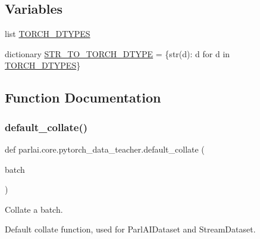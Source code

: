 \subsection*{Variables}
\begin{DoxyCompactItemize}
\item 
list \hyperlink{namespaceparlai_1_1core_1_1pytorch__data__teacher_a70d3594b63522c1d2596bd15f1fb89e0}{T\+O\+R\+C\+H\+\_\+\+D\+T\+Y\+P\+ES}
\item 
dictionary \hyperlink{namespaceparlai_1_1core_1_1pytorch__data__teacher_a34008e5ea53ba69d5da10b59d55abef4}{S\+T\+R\+\_\+\+T\+O\+\_\+\+T\+O\+R\+C\+H\+\_\+\+D\+T\+Y\+PE} = \{str(d)\+: d for d in \hyperlink{namespaceparlai_1_1core_1_1pytorch__data__teacher_a70d3594b63522c1d2596bd15f1fb89e0}{T\+O\+R\+C\+H\+\_\+\+D\+T\+Y\+P\+ES}\}
\end{DoxyCompactItemize}


\subsection{Function Documentation}
\mbox{\label{namespaceparlai_1_1core_1_1pytorch__data__teacher_a7236aa20497f2a598df9b85909901184}} 
\subsubsection{\texorpdfstring{default\+\_\+collate()}{default\_collate()}}
{\footnotesize\ttfamily def parlai.\+core.\+pytorch\+\_\+data\+\_\+teacher.\+default\+\_\+collate (\begin{DoxyParamCaption}\item[{}]{batch }\end{DoxyParamCaption})}

\begin{DoxyVerb}Collate a batch.

Default collate function, used for ParlAIDataset and StreamDataset.
\end{DoxyVerb}
 \mbox{\label{namespaceparlai_1_1core_1_1pytorch__data__teacher_a0c6f08553514c14d037da194f9d112ae}} 
